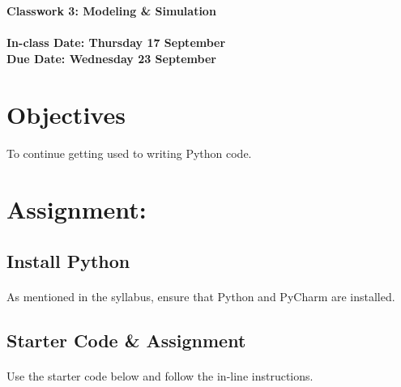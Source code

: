 \documentclass[letter,10pt]{article}
\begin{document}
    \huge
    \textbf{Classwork 3: Modeling \& Simulation}
    \normalsize
    \\ ~~ \\
    \textbf{In-class Date: Thursday 17 September} \\
    \textbf{Due Date: Wednesday 23 September}
    
    \section*{Objectives}
    \paragraph{}To continue getting used to writing Python code.
    
    \section*{Assignment:}
    \subsection{Install Python}
    \paragraph{}As mentioned in the syllabus, ensure that Python and PyCharm are installed.
    
    \subsection*{Starter Code \& Assignment}
    \paragraph{}Use the starter code below and follow the in-line instructions.
    
\end{document}
